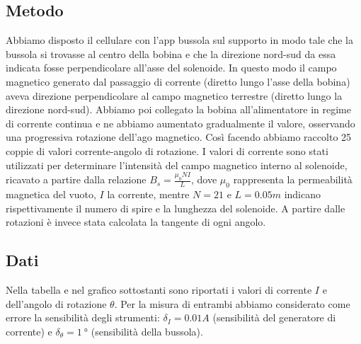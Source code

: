 \documentclass[a4paper]{article}
\begin{document}
\subsection{Metodo}
Abbiamo disposto il cellulare con l’app bussola sul supporto in modo tale che la bussola si trovasse al centro della bobina e che la direzione nord-sud da essa indicata
fosse perpendicolare all'asse del solenoide. In questo modo il campo magnetico generato dal passaggio di corrente (diretto lungo l'asse della bobina) aveva direzione perpendicolare
al campo magnetico terrestre (diretto lungo la direzione nord-sud). Abbiamo poi collegato la bobina all’alimentatore in regime di corrente continua e ne abbiamo aumentato gradualmente il valore,
osservando una progressiva rotazione dell'ago magnetico. Così facendo abbiamo raccolto 25 coppie di valori corrente-angolo di rotazione.
I valori di corrente sono stati utilizzati per determinare l'intensità del campo magnetico interno al solenoide, ricavato a partire dalla relazione \( B_s = \frac {\mu_0NI}{L} \),
dove \(\mu_0\) rappresenta la permeabilità magnetica del vuoto, \( \mathit{I} \) la corrente,
mentre \( \mathit{N=21} \) e \( \mathit{L=0.05m} \) indicano rispettivamente il numero di spire e la lunghezza del solenoide.
A partire dalle rotazioni è invece stata calcolata la tangente di ogni angolo.
\subsection{Dati}
Nella tabella e nel grafico sottostanti sono riportati i valori di corrente $I$ e dell'angolo di rotazione $\theta$.
Per la misura di entrambi abbiamo considerato come errore la sensibilità degli strumenti:
$\delta_I=0.01A$ (sensibilità del generatore di corrente) e $\delta_\theta=\SI{1}{\degree}$ (sensibilità della bussola).
\end{document}
